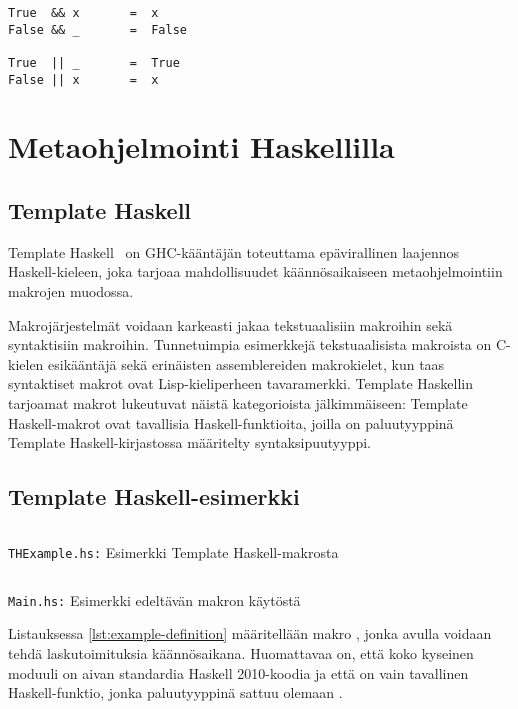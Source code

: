 \begin{verbatim}
True  && x       =  x
False && _       =  False

True  || _       =  True
False || x       =  x
\end{verbatim}

\section{Metaohjelmointi Haskellilla}
\subsection{Template Haskell}

Template Haskell~\cite{ThPaper} on GHC-kääntäjän toteuttama epävirallinen laajennos Haskell-kieleen,
joka tarjoaa mahdollisuudet käännösaikaiseen metaohjelmointiin makrojen muodossa.

Makrojärjestelmät voidaan karkeasti jakaa tekstuaalisiin makroihin sekä syntaktisiin makroihin.
Tunnetuimpia esimerkkejä tekstuaalisista makroista on C-kielen esikääntäjä sekä erinäisten assemblereiden makrokielet,
kun taas syntaktiset makrot ovat Lisp-kieliperheen tavaramerkki.
Template Haskellin tarjoamat makrot lukeutuvat näistä kategorioista jälkimmäiseen:
Template Haskell-makrot ovat tavallisia Haskell-funktioita,
joilla on paluutyyppinä Template Haskell-kirjastossa määritelty syntaksipuutyyppi.

\subsection{Template Haskell-esimerkki}

\begin{listing}[H]
    \inputminted{haskell}{codes/compile-time-eval-example/THExample.hs}
    \label{lst:example-definition}
    \caption{\texttt{THExample.hs:} Esimerkki Template Haskell-makrosta}
\end{listing}

\begin{listing}[H]
    \inputminted{haskell}{codes/compile-time-eval-example/Main.hs}
    \label{lst:example-usage}
    \caption{\texttt{Main.hs:} Esimerkki edeltävän makron käytöstä}
\end{listing}

Listauksessa \ref{lst:example-definition} määritellään makro ,
jonka avulla voidaan tehdä laskutoimituksia käännösaikana.
Huomattavaa on, että koko kyseinen moduuli on aivan standardia Haskell 2010-koodia
ja että  on vain tavallinen Haskell-funktio,
jonka paluutyyppinä sattuu olemaan .

